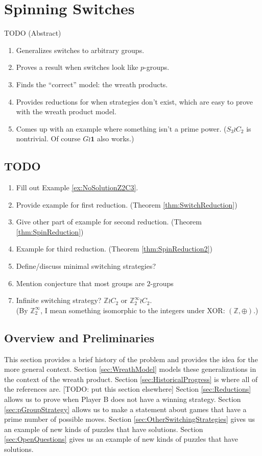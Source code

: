 \chapter{Spinning Switches}
\label{cha:research_topic_1}

TODO (Abstract)

\begin{enumerate}
  \item Generalizes switches to arbitrary groups.
  \item Proves a result when switches look like $p$-groups.
  \item Finds the ``correct'' model: the wreath products.
  \item Provides reductions for when strategies don't exist, which are easy to prove with the wreath product model.
  \item Comes up with an example where something isn't a prime power. ($S_3 \wr C_2$ is nontrivial. Of course $G \wr \mathbf{1}$ also works.)
\end{enumerate}

\section{TODO}
\begin{enumerate}
  \item Fill out Example \ref{ex:NoSolutionZ2C3}.
  \item Provide example for first reduction. (Theorem \ref{thm:SwitchReduction})
  \item Give other part of example for second reduction. (Theorem \ref{thm:SpinReduction})
  \item Example for third reduction. (Theorem \ref{thm:SpinReduction2})
  \item Define/discuss minimal switching strategies?
  \item Mention conjecture that most groups are $2$-groups
  \item Infinite switching strategy?
    $\mathbb{Z} \wr C_2$ or $\mathbb{Z}_2^\infty \wr C_2$. \\
    (By $\mathbb{Z}_2^\infty$, I mean something isomorphic to the integers under
    XOR: $(\mathbb{Z}, \oplus)$.)
\end{enumerate}

\section{Overview and Preliminaries}
This section provides a brief history of the problem and provides the idea for the more general context.
Section \ref{sec:WreathModel} models these generalizations in the context of the wreath product.
Section \ref{sec:HistoricalProgress} is where all of the references are. [TODO: put this section elsewhere]
Section \ref{sec:Reductions} allows us to prove when Player B does not have a winning strategy.
Section \ref{sec:pGroupStrategy} allows us to make a statement about games that have a prime number of possible moves.
Section \ref{sec:OtherSwitchingStrategies} gives us an example of new kinds of puzzles that have solutions.
Section \ref{sec:OpenQuestions} gives us an example of new kinds of puzzles that have solutions.

